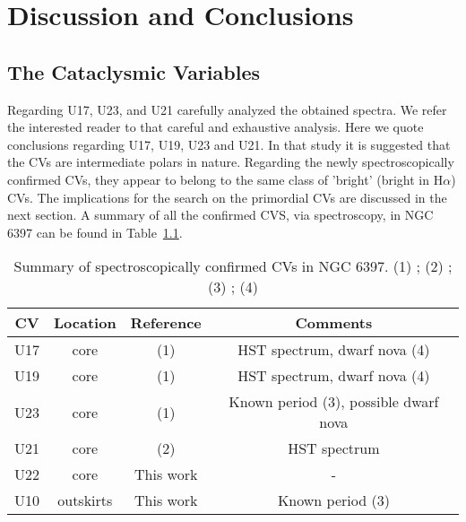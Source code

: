 \chapter{Discussion and Conclusions}\label{chap:conclu}
\thispagestyle{fancy}

\section{The Cataclysmic Variables}


Regarding U17, U23, and U21 \cite{edmonds_cataclysmic_1999} carefully analyzed the obtained spectra. We refer the interested reader to that careful and exhaustive analysis. Here we quote \citealt{edmonds_cataclysmic_1999} conclusions regarding U17, U19, U23 and U21. In that study it is suggested that the CVs are intermediate polars in nature.  Regarding the newly spectroscopically confirmed CVs, they appear to belong to the same class of 'bright' (bright in H$\alpha$) CVs. The implications for the search on the primordial CVs are discussed in the next section. A summary of all the confirmed CVS, via spectroscopy, in NGC 6397 can be found in Table~\ref{tab:sum}.


\begin{comment}
U17 CV3 -- Dwarf Nova
U19 CV2 -- Dwarf Nova
U23 CV1
U21 CV4
U10 CV6
U22 CV5
observed to undergo dwarf nova (DN ) eruptions with amplitudes
of at least 1.8 and 2.7 mag.
\end{comment}

\begin{table}[]
        \centering
\begin{tabular}{|c|c|c|c|}
\hline
\textbf{CV} & \textbf{Location} &  \textbf{Reference} & \textbf{Comments}\\ \hline
U17 & core  &  (1) & HST spectrum, dwarf nova (4)           \\ \hline
U19 & core  &  (1) & HST spectrum, dwarf nova (4)           \\ \hline
U23         & core   & (1)                       &  Known period (3), possible dwarf nova             \\ \hline

U21         & core  & (2)   & HST spectrum                            \\ \hline
U22         & core                       & This work                         &   -                         \\ \hline
U10         & outskirts                        & This work                      &  Known period (3)              \\ \hline
\end{tabular}
\caption[Summary of spectroscopically confirmed CVs in NGC 6397]{Summary of spectroscopically confirmed  CVs in NGC 6397. (1) \citealt{grindlay_spectroscopic_1995}; (2) \citealt{edmonds_cataclysmic_1999}; (3) \citealt{kaluzny_time_2003}; (4) \citep{shara_erupting_2005} }
\label{tab:sum}
\end{table}

